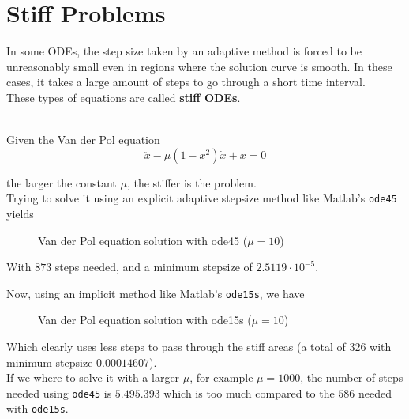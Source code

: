 \section{Stiff Problems}

In some ODEs, the step size taken by an adaptive method is forced to be unreasonably small even in regions where the solution curve is smooth. In these cases, it takes a large amount of steps to go through a short time interval.\\

These types of equations are called \textbf{stiff ODEs}.

\begin{example}\-\\
Given the Van der Pol equation $$\ddot{x} - \mu(1-x^2)\dot{x} + x = 0$$

the larger the constant $\mu$, the stiffer is the problem. \\

Trying to solve it using an explicit adaptive stepsize method like Matlab's \texttt{ode45} yields

\begin{figure}[h]
  \centering
  
  \caption{Van der Pol equation solution with ode45 ($\mu = 10$)}
\end{figure}

With $873$ steps needed, and a minimum stepsize of $2.5119\cdot 10^{-5}$.\\

\newpage

Now, using an implicit method like Matlab's \texttt{ode15s}, we have

\begin{figure}[h]
  \centering
  
  \caption{Van der Pol equation solution with ode15s ($\mu = 10$)}
\end{figure}

Which clearly uses less steps to pass through the stiff areas (a total of $326$ with minimum stepsize $0.00014607$).\\

If we where to solve it with a larger $\mu$, for example $\mu = 1000$, the number of steps needed using \texttt{ode45} is $5.495.393$ which is too much compared to the $586$ needed with \texttt{ode15s}.

\end{example}